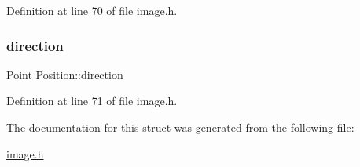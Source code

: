 Definition at line 70 of file image.\+h.

\mbox{\label{struct_position_a780d124971951424c0c63f6d81bb4d92}} 
\subsubsection{\texorpdfstring{direction}{direction}}
{\footnotesize\ttfamily Point Position\+::direction}



Definition at line 71 of file image.\+h.



The documentation for this struct was generated from the following file\+:\begin{DoxyCompactItemize}
\item 
\hyperlink{image_8h}{image.\+h}\end{DoxyCompactItemize}
